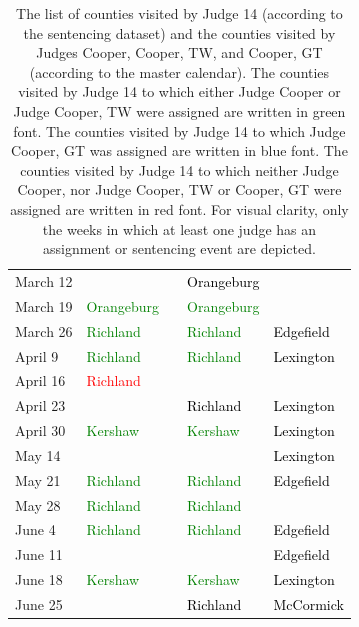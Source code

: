 \documentclass[11pt]{article}
\theoremstyle{ModifiedStyle}
\begin{document}
\begin{table}[H]
{\begin{tabular}{L{23mm}C{55mm}C{38mm}C{38mm}C{38mm}}
    			\rule{0pt}{2.3ex} March 12 & & & \textcolor{black}{Orangeburg} &\\
    			\rule{0pt}{2.3ex} March 19 &  \textcolor{green}{Orangeburg} & & \textcolor{green}{Orangeburg} &\\
    			\rule{0pt}{2.3ex} March 26 &  \textcolor{green}{Richland} & & \textcolor{green}{Richland} &  \textcolor{black}{Edgefield}\\
    			\rule{0pt}{2.3ex} April 9 &  \textcolor{green}{Richland} & & \textcolor{green}{Richland} &  \textcolor{black}{Lexington}\\
    			\rule{0pt}{2.3ex} April 16 &  \textcolor{red}{Richland} & & &\\
    			\rule{0pt}{2.3ex} April 23 & & & \textcolor{black}{Richland} &  \textcolor{black}{Lexington}\\
    			\rule{0pt}{2.3ex} April 30 &  \textcolor{green}{Kershaw} & & \textcolor{green}{Kershaw} &  \textcolor{black}{Lexington}\\
    			\rule{0pt}{2.3ex} May 14 & & & &  \textcolor{black}{Lexington}\\\rule{0pt}{2.3ex} May 21 &  \textcolor{green}{Richland} & & \textcolor{green}{Richland} &  \textcolor{black}{Edgefield}\\
    			\rule{0pt}{2.3ex} May 28 &  \textcolor{green}{Richland} & & \textcolor{green}{Richland} &\\
    			\rule{0pt}{2.3ex} June 4 &  \textcolor{green}{Richland} & & \textcolor{green}{Richland} &  \textcolor{black}{Edgefield}\\
    			\rule{0pt}{2.3ex} June 11 & & & &  \textcolor{black}{Edgefield}\\\rule{0pt}{2.3ex} June 18 &  \textcolor{green}{Kershaw} & & \textcolor{green}{Kershaw} &  \textcolor{black}{Lexington}\\
    			\rule{0pt}{2.3ex} June 25 & & & \textcolor{black}{Richland} &  \textcolor{black}{McCormick}\\
    			\hline
    		\end{tabular}
    	}
    	\vspace{-1mm}
    	\caption{The list of counties visited by Judge 14 (according to the sentencing dataset) and the counties visited by Judges Cooper, Cooper, TW, and Cooper, GT (according to the master calendar). The counties visited by Judge 14 to which either Judge Cooper or Judge Cooper, TW were assigned are written in green font. The counties visited by Judge 14 to which Judge Cooper, GT was assigned are written in blue font. The counties visited by Judge 14 to which neither Judge Cooper, nor Judge Cooper, TW or Cooper, GT were assigned are written in red font. For visual clarity, only the weeks in which at least one judge has an assignment or sentencing event are depicted.}
    	\label{Table_Coopers_Schedules}
    	\vspace{-2mm}
    \end{table}
\end{document}
